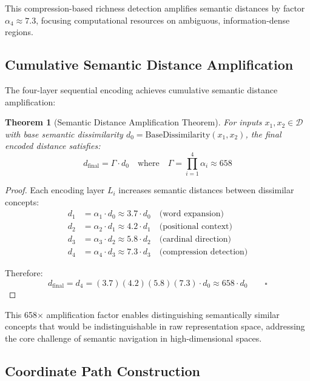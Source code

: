 \documentclass[12pt,a4paper]{article}
\newtheorem{theorem}{Theorem}
\begin{document}
This compression-based richness detection amplifies semantic distances by factor $\alpha_4 \approx 7.3$, focusing computational resources on ambiguous, information-dense regions.

\subsection{Cumulative Semantic Distance Amplification}

The four-layer sequential encoding achieves cumulative semantic distance amplification:

\begin{theorem}[Semantic Distance Amplification Theorem]
For inputs $x_1, x_2 \in \mathcal{D}$ with base semantic dissimilarity $d_0 = \text{BaseDissimilarity}(x_1, x_2)$, the final encoded distance satisfies:
\begin{equation}
d_{\text{final}} = \Gamma \cdot d_0 \quad \text{where} \quad \Gamma = \prod_{i=1}^4 \alpha_i \approx 658
\end{equation}
\end{theorem}

\begin{proof}
Each encoding layer $L_i$ increases semantic distances between dissimilar concepts:
\begin{align}
d_1 &= \alpha_1 \cdot d_0 \approx 3.7 \cdot d_0 \quad \text{(word expansion)} \\
d_2 &= \alpha_2 \cdot d_1 \approx 4.2 \cdot d_1 \quad \text{(positional context)} \\
d_3 &= \alpha_3 \cdot d_2 \approx 5.8 \cdot d_2 \quad \text{(cardinal direction)} \\
d_4 &= \alpha_4 \cdot d_3 \approx 7.3 \cdot d_3 \quad \text{(compression detection)}
\end{align}

Therefore:
\begin{equation}
d_{\text{final}} = d_4 = (3.7)(4.2)(5.8)(7.3) \cdot d_0 \approx 658 \cdot d_0 \qquad \square
\end{equation}
\end{proof}

This 658× amplification factor enables distinguishing semantically similar concepts that would be indistinguishable in raw representation space, addressing the core challenge of semantic navigation in high-dimensional spaces.

\subsection{Coordinate Path Construction}
\end{document}
